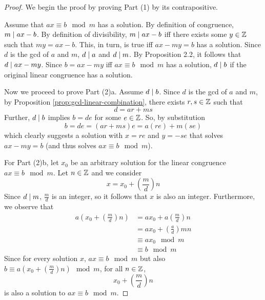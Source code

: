 \begin{proof}
    We begin the proof by proving Part (1) by its contrapositive.
    
    Assume that $ax \equiv b \mod m$ has a solution. By definition of congruence, $m \mathrel{\mid} ax - b$. By definition of divisibility, $m \mathrel{\mid} ax - b$ iff there exists some $y \in \mathbb{Z}$ such that $my = ax-b$. This, in turn, is true iff $ax - my = b$ has a solution. Since $d$ is the gcd of $a$ and $m$, $d \mathrel{\mid} a$ and $d \mathrel{\mid} m$. By Proposition 2.2, it follows that $d \mathrel{\mid} ax - my$. Since $b = ax - my$ iff $ax \equiv b \mod m$ has a solution, $d \mathrel{\mid} b$ if the original linear congruence has a solution.

    Now we proceed to prove Part (2)a. Assume $d \mathrel{\mid} b$. Since $d$ is the gcd of $a$ and $m$, by Proposition \ref{prop:gcd-linear-combination}, there exists $r,s \in \mathbb{Z}$ such that
    $$
    d = ar + ms
    $$
    Further, $d \mathrel{\mid} b$ implies $b = de$ for some $e \in \mathbb{Z}$. So, by substitution
    $$
    b = de = (ar + ms)e = a(re) + m(se)
    $$
    which clearly suggests a solution with $x = re$ and $y = -se$ that solves $ax - my = b$ (and thus solves $ax \equiv b \mod m$).

    For Part (2)b, let $x_0$ be an arbitrary solution for the linear congruence $ax \equiv b \mod m$. Let $n \in \mathbb{Z}$ and we consider
    $$
    x = x_0 + \left( \frac{m}{d} \right) n
    $$
    Since $d \mathrel{\mid} m$, $\frac{m}{d}$ is an integer, so it follows that $x$ is also an integer. Furthermore, we observe that
    $$
    \begin{aligned}
        a\left( x_0 + \left( \frac{m}{d} \right) n \right) &= ax_0 + a\left( \frac{m}{d} \right) n \\
        &= ax_0 + \left( \frac{a}{d} \right) mn \\
        &\equiv ax_0 \mod m \\
        &\equiv b \mod m
    \end{aligned}
    $$
    Since for every solution $x$, $ax \equiv b \mod m$ but also $b \equiv a(x_0 + (\frac{m}{d})n) \mod m$, for all $n \in \mathbb{Z}$,
    $$
    x_0 + \left( \frac{m}{d} \right) n
    $$
    is also a solution to $ax \equiv b \mod m$.
\end{proof}


